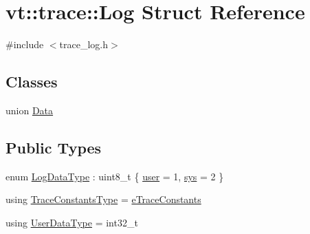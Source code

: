 \hypertarget{structvt_1_1trace_1_1_log}{}\section{vt\+:\+:trace\+:\+:Log Struct Reference}
\label{structvt_1_1trace_1_1_log}


{\ttfamily \#include $<$trace\+\_\+log.\+h$>$}

\subsection*{Classes}
\begin{DoxyCompactItemize}
\item 
union \hyperlink{unionvt_1_1trace_1_1_log_1_1_data}{Data}
\end{DoxyCompactItemize}
\subsection*{Public Types}
\begin{DoxyCompactItemize}
\item 
enum \hyperlink{structvt_1_1trace_1_1_log_ae1c08093fd18967b7d4912d04d6acc3d}{Log\+Data\+Type} \+: uint8\+\_\+t \{ \hyperlink{structvt_1_1trace_1_1_log_ae1c08093fd18967b7d4912d04d6acc3da14b709efcf6184d83649a7b3ce6cf8ca}{user} = 1, 
\hyperlink{structvt_1_1trace_1_1_log_ae1c08093fd18967b7d4912d04d6acc3da4cef9fb4034808a9f6c627a664c86b93}{sys} = 2
 \}
\item 
using \hyperlink{structvt_1_1trace_1_1_log_a06f69176ce883a9e8a45ffb726fdc558}{Trace\+Constants\+Type} = \hyperlink{namespacevt_1_1trace_acf454dfbd581b0ebae895f90b5927a1d}{e\+Trace\+Constants}
\item 
using \hyperlink{structvt_1_1trace_1_1_log_af392c3825bf45d286a0f77bddf7a96cf}{User\+Data\+Type} = int32\+\_\+t
\end{DoxyCompactItemize}
